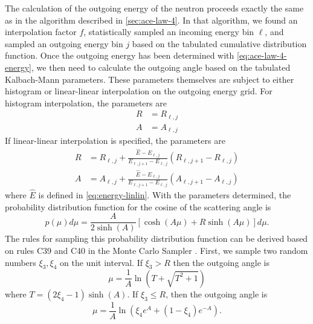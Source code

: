 The calculation of the outgoing energy of the neutron proceeds exactly the same
as in the algorithm described in \autoref{sec:ace-law-4}. In that algorithm, we
found an interpolation factor $f$, statistically sampled an incoming energy bin
$\ell$, and sampled an outgoing energy bin $j$ based on the tabulated cumulative
distribution function. Once the outgoing energy has been determined with
\eqref{eq:ace-law-4-energy}, we then need to calculate the outgoing angle based
on the tabulated Kalbach-Mann parameters. These parameters themselves are
subject to either histogram or linear-linear interpolation on the outgoing
energy grid. For histogram interpolation, the parameters are
\begin{equation}
  \label{eq:KM-parameters-histogram}
  \begin{split}
    R &= R_{\ell,j} \\ 
    A &= A_{\ell,j}
  \end{split}
\end{equation}
If linear-linear interpolation is specified, the parameters are
\begin{equation}
  \label{eq:KM-parameters-linlin}
  \begin{split}
    R &= R_{\ell,j} + \frac{\hat{E} - E_{\ell,j}}{E_{\ell,j+1} - E_{\ell,j}} (
    R_{\ell,j+1} - R_{\ell,j} ) \\
    A &= A_{\ell,j} + \frac{\hat{E} - E_{\ell,j}}{E_{\ell,j+1} - E_{\ell,j}} (
    A_{\ell,j+1} - A_{\ell,j} )
  \end{split}
\end{equation}
where $\hat{E}$ is defined in \eqref{eq:energy-linlin}. With the parameters
determined, the probability distribution function for the cosine of the
scattering angle is
\begin{equation}
  \label{eq:KM-pdf-angle}
  p(\mu) d\mu = \frac{A}{2 \sinh (A)} \left [ \cosh (A\mu) + R \sinh (A\mu)
    \right ] d\mu.
\end{equation}
The rules for sampling this probability distribution function can be derived
based on rules C39 and C40 in the Monte Carlo Sampler
\cite{lanl-everett-1983}. First, we sample two random numbers $\xi_3, \xi_4$ on
the unit interval. If $\xi_3 > R$ then the outgoing angle is
\begin{equation}
  \label{eq:KM-angle-1}
  \mu = \frac{1}{A} \ln \left ( T + \sqrt{T^2 + 1} \right )
\end{equation}
where $T = (2 \xi_4 - 1) \sinh (A)$. If $\xi_3 \le R$, then the
outgoing angle is
\begin{equation}
  \label{eq:KM-angle-2}
  \mu = \frac{1}{A} \ln \left ( \xi_4 e^A + (1 - \xi_4) e^{-A} \right ).
\end{equation}

